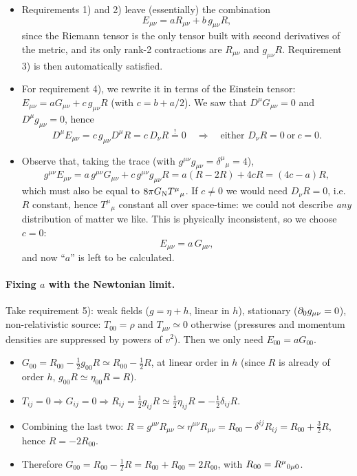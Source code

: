 \begin{itemize}
\item Requirements 1) and 2) leave (essentially) the combination
\[
  E_{\mu\nu}=aR_{\mu\nu}+b\,g_{\mu\nu}R ,
\]
since the Riemann tensor is the only tensor built with second derivatives of the metric, and its only rank-2 contractions are $R_{\mu\nu}$ and $g_{\mu\nu}R$. Requirement 3) is then automatically satisfied.
\item For requirement 4), we rewrite it in terms of the Einstein tensor: $E_{\mu\nu}=aG_{\mu\nu}+c\,g_{\mu\nu}R$ (with $c=b+a/2$). We saw that $D^\mu G_{\mu\nu}=0$ and $D^\mu g_{\mu\nu}=0$, hence
\[
  D^\mu E_{\mu\nu}=c\,g_{\mu\nu}D^\mu R=c\,D_\nu R\overset{!}{=}0\quad\Longrightarrow\quad\text{either }D_\nu R=0\ \text{or}\ c=0 .
\]
\item Observe that, taking the trace (with $g^{\mu\nu}g_{\mu\nu}=\delta^\mu{}_\mu=4$),
\[
  g^{\mu\nu}E_{\mu\nu}=a\,g^{\mu\nu}G_{\mu\nu}+c\,g^{\mu\nu}g_{\mu\nu}R=a(R-2R)+4cR=(4c-a)R ,
\]
which must also be equal to $8\pi G_{\mathrm N} T^\mu{}_\mu$. If $c\neq0$ we would need $D_\nu R=0$, i.e.\ $R$ constant, hence $T^\mu{}_\mu$ constant all over space-time: we could not describe \emph{any} distribution of matter we like. This is physically inconsistent, so we choose $c=0$:
\begin{equation}
  E_{\mu\nu}=a\,G_{\mu\nu},
\end{equation}
and now ``$a$'' is left to be calculated.
\end{itemize}

\paragraph{Fixing $a$ with the Newtonian limit.} Take requirement 5): weak fields ($g=\eta+h$, linear in $h$), stationary ($\partial_0g_{\mu\nu}=0$), non-relativistic source: $T_{00}=\rho$ and $T_{\mu\nu}\simeq0$ otherwise (pressures and momentum densities are suppressed by powers of $v^2$). Then we only need $E_{00}=aG_{00}$.
\begin{itemize}
\item $G_{00}=R_{00}-\frac12g_{00}R\simeq R_{00}-\frac12R$, at linear order in $h$ (since $R$ is already of order $h$, $g_{00}R\simeq\eta_{00}R=R$).
\item $T_{ij}=0\Rightarrow G_{ij}=0\Rightarrow R_{ij}=\frac12 g_{ij}R\simeq\frac12\eta_{ij}R=-\frac12\delta_{ij}R$.
\item Combining the last two: $R=g^{\mu\nu}R_{\mu\nu}\simeq\eta^{\mu\nu}R_{\mu\nu}=R_{00}-\delta^{ij}R_{ij}=R_{00}+\frac32R$, hence $\boxed{R=-2R_{00}}$.
\item Therefore $G_{00}=R_{00}-\frac12R=R_{00}+R_{00}=2R_{00}$, with $R_{00}=R^{\mu}{}_{0\mu0}$.
\end{itemize}


